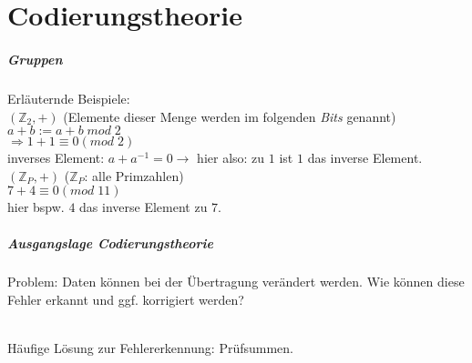 \chapter{Codierungstheorie}

\paragraph{Gruppen}
Erläuternde Beispiele:\\
$(\mathbb{Z}_2,+)$ (Elemente dieser Menge werden im folgenden \emph{Bits} genannt)\\
$a+b:=a+b\; mod\; 2$\\
$\Rightarrow 1+1\equiv 0 (mod\; 2)$\\
inverses Element: $a+a^{-1}=0 \rightarrow$ hier also: zu $1$ ist $1$ das inverse Element.\medskip\\
$(\mathbb{Z}_P,+)$ ($\mathbb{Z}_P$: alle Primzahlen)\\
$7+4\equiv 0 (mod\; 11)$\\
hier bspw. $4$ das inverse Element zu $7$.

\paragraph{Ausgangslage Codierungstheorie}\parskp
Problem: Daten können bei der Übertragung verändert werden. Wie können diese Fehler erkannt und ggf. korrigiert werden?\\
\\
Häufige Lösung zur Fehlererkennung: Prüfsummen.
